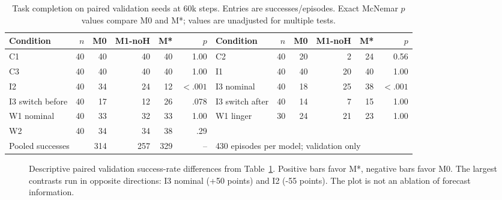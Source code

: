 \documentclass[conference]{IEEEtran}
\begin{document}
\begin{table}[t]
\caption{Task completion on paired validation seeds at 60k steps. Entries are successes/episodes. Exact McNemar $p$ values compare M0 and M*; values are unadjusted for multiple tests.}
\label{tab:success}
\centering\footnotesize
\begin{tabular}{lrrrrr@{\hspace{0.55cm}}lrrrrr}
\toprule
Condition & $n$ & M0 & M1-noH & M* & $p$ &
Condition & $n$ & M0 & M1-noH & M* & $p$\\
\midrule
C1 &40&40&40&40&1.00 & C2 &40&20&2&24&0.56\\
C3 &40&40&40&40&1.00 & I1 &40&40&20&40&1.00\\
I2 &40&34&24&12&$<.001$ & I3 nominal &40&18&25&38&$<.001$\\
I3 switch before &40&17&12&26&.078 & I3 switch after &40&14&7&15&1.00\\
W1 nominal &40&33&32&33&1.00 & W1 linger &30&24&21&23&1.00\\
W2 &40&34&34&38&.29 & \multicolumn{6}{l}{}\\
\midrule
\multicolumn{2}{l}{Pooled successes} &314&257&329&-- &\multicolumn{6}{l}{430 episodes per model; validation only}\\
\bottomrule
\end{tabular}
\end{table}

\begin{figure}[t]
\centering
{}
\caption{Descriptive paired validation success-rate differences from Table~\ref{tab:success}. Positive bars favor M*, negative bars favor M0. The largest contrasts run in opposite directions: I3 nominal (+50 points) and I2 (-55 points). The plot is not an ablation of forecast information.}
\label{fig:deltas}
\end{figure}
\end{document}
